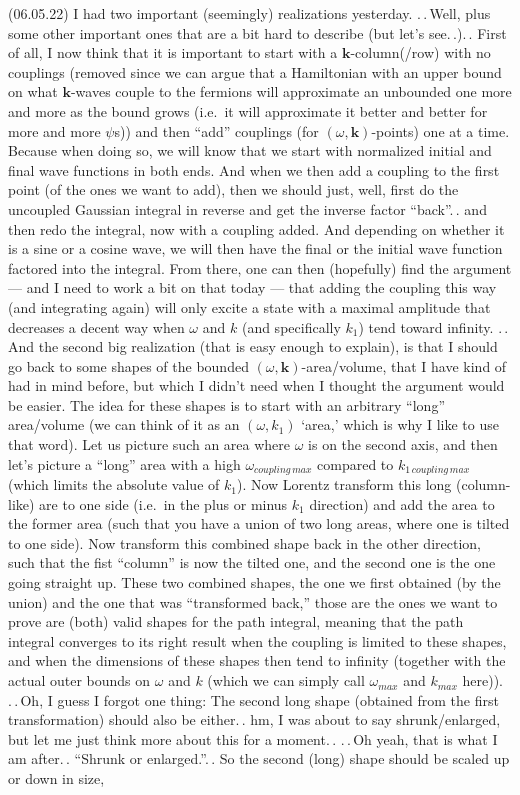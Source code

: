 \documentclass{report}
\begin{document}
(06.05.22) I had two important (seemingly) realizations yesterday. .\,.\,Well, plus some other important ones that are a bit hard to describe (but let's see.\,.).\,. First of all, I now think that it is important to start with a $\boldsymbol{k}$-column(/row) with no couplings (removed since we can argue that a Hamiltonian with an upper bound on what $\boldsymbol{k}$-waves couple to the fermions will approximate an unbounded one more and more as the bound grows (i.e.\ it will approximate it better and better for more and more $\psi$s)) and then ``add'' couplings (for $(\omega, \boldsymbol{k})$-points) one at a time. Because when doing so, we will know that we start with normalized initial and final wave functions in both ends. And when we then add a coupling to the first point (of the ones we want to add), then we should just, well, first do the uncoupled Gaussian integral in reverse and get the inverse factor ``back''.\,. and then redo the integral, now with a coupling added. And depending on whether it is a sine or a cosine wave, we will then have the final or the initial wave function factored into the integral. From there, one can then (hopefully) find the argument --- and I need to work a bit on that today --- that adding the coupling this way (and integrating again) will only excite a state with a maximal amplitude that decreases a decent way when $\omega$ and $k$ (and specifically $k_1$) tend toward infinity. .\,.\,And the second big realization (that is easy enough to explain), is that I should go back to some shapes of the bounded $(\omega, \boldsymbol{k})$-area/volume, that I have kind of had in mind before, but which I didn't need when I thought the argument would be easier. The idea for these shapes is to start with an arbitrary ``long'' area/volume (we can think of it as an $(\omega, k_1)$ `area,' which is why I like to use that word). Let us picture such an area where $\omega$ is on the second axis, and then let's picture a ``long'' area with a high $\omega_{coupling\, max}$ compared to $k_{1\, coupling\, max}$ (which limits the absolute value of $k_1$). Now Lorentz transform this long (column-like) are to one side (i.e.\ in the plus or minus $k_1$ direction) and add the area to the former area (such that you have a union of two long areas, where one is tilted to one side). Now transform this combined shape back in the other direction, such that the fist ``column'' is now the tilted one, and the second one is the one going straight up. These two combined shapes, the one we first obtained (by the union) and the one that was ``transformed back,'' those are the ones we want to prove are (both) valid shapes for the path integral, meaning that the path integral converges to its right result when the coupling is limited to these shapes, and when the dimensions of these shapes then tend to infinity (together with the actual outer bounds on $\omega$ and $k$ (which we can simply call $\omega_{max}$ and $k_{max}$ here)). .\,.\,Oh, I guess I forgot one thing: The second long shape (obtained from the first transformation) should also be either.\,. hm, I was about to say shrunk/enlarged, but let me just think more about this for a moment.\,. .\,.\,Oh yeah, that is what I am after.\,. ``Shrunk or enlarged.''.\,. So the second (long) shape should be scaled up or down in size, 
\end{document}

